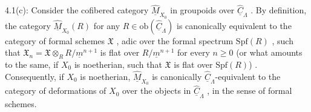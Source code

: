 \begin{center}
\end{center}
4.1(c): Consider the cofibered category $\widehat{\underline{M}}_{X_0}$ in groupoids over $\widehat{\underline{C}}_\Lambda$ . By definition, the category $\widehat{\underline{M}}_{X_0}(R)$ for any $R \in \mathrm{ob}(\widehat{\underline{C}}_\Lambda)$ is canonically equivalent to the category of formal schemes $\mathfrak{X}$ , adic over the formal spectrum $\mathrm{Spf}(R)$ , such that $\mathfrak{X}_n = \mathfrak{X} \otimes_R R/\underline{m}^{n+1}$ is flat over $R/\underline{m}^{n+1}$ for every $n \geq 0$ (or what amounts to the same, if $X_0$ is noetherian, such that $\mathfrak{X}$ is flat over $\mathrm{Spf}(R)$) . Consequently, if $X_0$ is noetherian, $\widehat{\underline{M}}_{X_0}$ is canonically $\widehat{\underline{C}}_\Lambda$-equivalent to the category of deformations of $X_0$ over the objects in $\widehat{\underline{C}}_\Lambda$ , in the sense of formal schemes.

